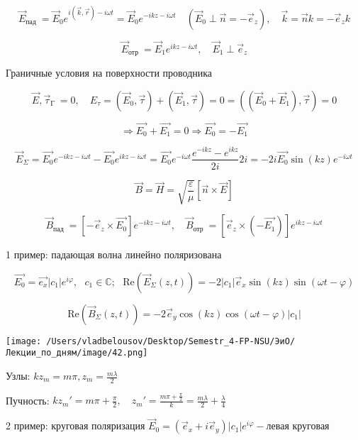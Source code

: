 \documentclass[12pt, a4paper]{report}
\begin{document}
\[ \vec{E } _{\text{пад } } =   \vec{E }  _ 0 e^{i (\vec{k},\vec{r }     )- i \omega t }  = \vec{E } _0 e^{- i k z - i \omega t } \quad ( \vec{E } _0 \perp \vec{n }  = - \vec{e } _z ), \quad \vec{k } = \vec{n } k = - \vec{e }_z k\] 

\[ \vec{E } _{\text{отр }  } = \vec{E } _1 e^{i kz - i \omega t }, \quad  \vec{E } _1 \perp \vec{e }_z     \] 

Граничные условия на поверхности проводника

\[ \vec{E } , \vec{\tau }_{\text{Г } } = 0 , \quad E_{\tau } =( \vec{E } _ 0 ,\vec{\tau } )+ ( \vec{E } _ 1 , \vec{\tau } ) = 0 = ((\vec{E } _0 + \vec{E } _1), \vec{\tau } )= 0      \] 

\[ \Rightarrow \vec{E_0} + \vec{E_1 } = 0 \Rightarrow \vec{E_0 } = -\vec{E_1}      \] 

\[ \vec{E}_{\Sigma } = \vec{E_0 }e^{ - i kz - i\omega t}  - \vec{E_0 }e^{i kz - i \omega t } = \vec{E_0 }e^{- i \omega t } \frac{ e^{- ikz } - e^{i kz } }{2i } 2 i= -2i \vec{E_0 }\sin (kz) e^{- i \omega t }          \] 

\[ \vec{B }  = \vec{H }  = \sqrt{\frac{ \varepsilon }{\mu } } [ \vec{n } \times  \vec{E } ]  \]

\[ \vec{B }_{\text{пад } } = [ - \vec{e } _z \times  \vec{E_0}  ]   e^{- ikz - i \omega t } , \quad  \vec{B }_{\text{отр } } = [  \vec{e } _z \times  (-\vec{E_1 }) ] e^{ikz - i \omega t } \] 

1 пример: падающая волна линейно поляризована 

\[ \vec{E_0 } = \vec{e_x  }|c_1         | e^{i \varphi } , \text{ }  c_1 \in \mathbb{C} ; \text{ } \mathrm{Re }  (\vec{E }_{\Sigma }( z, t ))  = - 2 |c_1 | \vec{e } _x \sin(kz ) \sin (\omega t  - \varphi )        \] 

\[ \mathrm{Re } (\vec{B } _{\Sigma } (z, t ) ) = - 2 \vec{e }  _{y }  \cos ( kz ) \cos  ( \omega t - \varphi ) |c_1 | \] 

\begin{center}
    \texttt{[image: /Users/vladbelousov/Desktop/Semestr\_4-FP-NSU/ЭиО/Лекции\_по\_дням/image/42.png]}
\end{center}
Узлы: \( k z_{m }= m \pi , z_{m }  = \frac{m \lambda }{2 } \) 


Пучность: \( k z_{m } ' = m \pi + \frac{\pi}{2 } , \quad  z_m ' = \frac{ m \pi + \frac{\pi}{2} }{k } = \frac{m \lambda }{2} + \frac{\lambda}{ 4 }    \) 

2 пример: круговая поляризация \( \vec{E } _0 = ( \vec{e } _ x + i \vec{e } _ y ) |c_1 |e^{ i \varphi} - \text{левая круговая}  \) 
\end{document}
